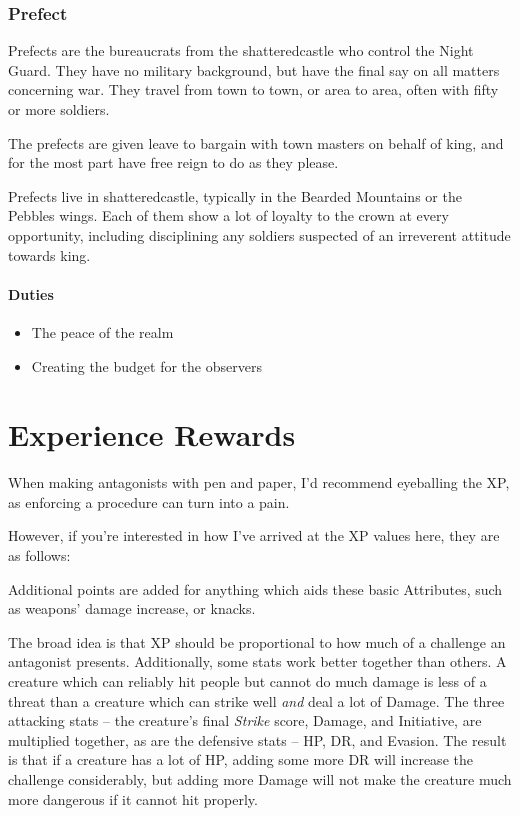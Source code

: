 \begin{multicols}{2}
\subsection{Prefect}

Prefects are the bureaucrats from the \gls{shatteredcastle} who control the Night Guard.
They have no military background, but have the final say on all matters concerning war.
They travel from town to town, or area to area, often with fifty or more soldiers.

The prefects are given leave to bargain with town masters on behalf of \gls{king}, and for the most part have free reign to do as they please.

Prefects live in \gls{shatteredcastle}, typically in the Bearded Mountains or the Pebbles wings.
Each of them show a lot of loyalty to the crown at every opportunity, including disciplining any soldiers suspected of an irreverent attitude towards \gls{king}.

\subsubsection{Duties}

\begin{itemize}

	\item{The peace of the realm}
	\item{Creating the budget for the observers}

\end{itemize}

\end{multicols}

\chapter{Experience Rewards}

\begin{multicols}{2}

\noindent When making antagonists with pen and paper, I'd recommend eyeballing the XP, as enforcing a procedure can turn into a pain.

However, if you're interested in how I've arrived at the XP values here, they are as follows:

Additional points are added for anything which aids these basic Attributes, such as weapons' damage increase, or knacks.

The broad idea is that XP should be proportional to how much of a challenge an antagonist presents.
Additionally, some stats work better together than others.
A creature which can reliably hit people but cannot do much damage is less of a threat than a creature which can strike well \emph{and} deal a lot of Damage.
The three attacking stats -- the creature's final \textit{Strike} score, Damage, and Initiative, are multiplied together, as are the defensive stats -- HP, DR, and Evasion.
The result is that if a creature has a lot of HP, adding some more DR will increase the challenge considerably, but adding more Damage will not make the creature much more dangerous if it cannot hit properly.

\end{multicols}

